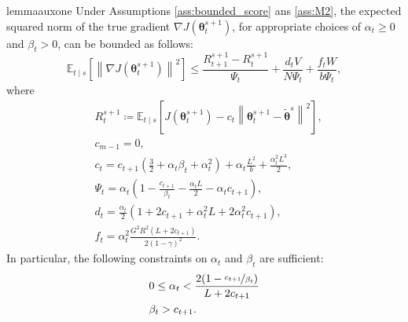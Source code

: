 \documentclass{article}
\theoremstyle{remark}
\theoremstyle{definition}
\newcommand{\norm}[2][\infty]{\left\|#2\right\|_{#1}}
\newcommand{\vtheta}{\boldsymbol{\theta}}
\newcommand{\gradJ}[1]{\nabla J(#1)}
\newcommand{\Ets}[2][t]{\mathbb{E}_{#1\mid s}\left[#2\right]}
\begin{document}
\begin{restatable}[]{lemma}{auxone}\label{lemma:aux1}
Under Assumptions \ref{ass:bounded_score} ans \ref{ass:M2}, the expected squared norm of the true gradient $\gradJ{\vtheta_t^{s+1}}$, for appropriate choices of $\alpha_t\geq0$ and $\beta_t>0$, can be bounded as follows:
\[
	\Ets{\norm[]{\gradJ{\vtheta_t^{s+1}}}^2} \leq
	\frac{R_{t+1}^{s+1} - R_t^{s+1}}{\Psi_t} + \frac{d_tV}{N\Psi_t}
	+\frac{f_tW}{b\Psi_t},
\]
	where
\begin{align*}
	&R_t^{s+1}\coloneqq \Ets{J(\vtheta_t^{s+1}) - c_t\norm[]{\vtheta_t^{s+1}-\tilde{\vtheta}^s}^2}, \\
	&c_{m-1} = 0, \\
	&c_t = c_{t+1}\left(\frac{3}{2}+\alpha_t\beta_t+\alpha_t^2\right) + \alpha_t\frac{L^2}{b}+\frac{\alpha_t^2L^3}{2}, \\
	&\Psi_t = \alpha_t\left(1-\frac{c_{t+1}}{\beta_t}-\frac{\alpha_tL}{2}-\alpha_tc_{t+1}\right), \\
	&d_t = \frac{\alpha_t}{2}\left(1+2c_{t+1}+\alpha_t^2L+2\alpha_t^2c_{t+1}\right), \\
	&f_t = \alpha_t^2\frac{G^2R^2(L+2c_{t+1})}{2(1-\gamma)^2}.
\end{align*}
In particular, the following constraints on $\alpha_t$ and $\beta_t$ are sufficient:
\begin{align*}
&0\leq\alpha_t < \frac{2(1-\nicefrac{c_{t+1}}{\beta_t})}{L+2c_{t+1}} \\
&\beta_t > c_{t+1}.
\end{align*}
\end{restatable}
\end{document}
